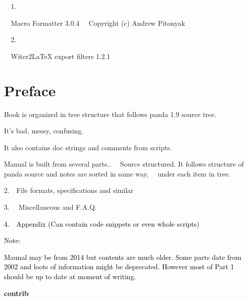 \documentclass[a4paper]{article}
\newcommand\textstyleOOoComputerKeyWord[1]{\textrm{\textcolor[rgb]{0.0,0.0,0.5019608}{#1}}}
\begin{document}
{\color{black}
\ \ 1.}

{\color{black}
\ \ Macro Formatter 3.0.4 \newline
\ \ Copyright (c) Andrew Pitonyak}

{\color{black}
\ \ 2.}

{\color{black}
\ \ Witer2LaTeX export filters 1.2.1}


\bigskip

\clearpage\section[Preface]{Preface}
\hypertarget{RefHeading9841663648339}{}{\color{black}
Book is organized in tree structure that follows panda 1.9 source tree.}

{\color{black}
It's bad, messy, confusing.}

{\color{black}
It also contains doc strings and comments from scripts.}

{\color{black}
Manual is built from several parts.. \ \ Source structured. It follows structure of panda source and notes are sorted in same way, \ \ under each item in
tree.}

{\color{black}
2.\ \ File formats, specifications and similar}

{\color{black}
3. \ \ Miscellaneous and F.A.Q.}

{\color{black}
\textstyleOOoComputerKeyWord{\textcolor{black}{4.\ \ Appendix (Can contain code snippets or even whole scripts)}}}


\bigskip


\bigskip

{\color{black}
\textstyleOOoComputerKeyWord{\textcolor{black}{Note:}}}

{\color{black}
\textstyleOOoComputerKeyWord{\textcolor{black}{Maunal may be from 2014 but contents are much older. Some parts date from
2002 and loots of information might be deprecated. However most of Part 1 should be up to date at moment of writing.}}}


\bigskip


\clearpage
\bigskip


\bigskip

{\centering\sffamily\bfseries
\hypertarget{RefHeading17371167907073}{}contrib
\par}
\end{document}
